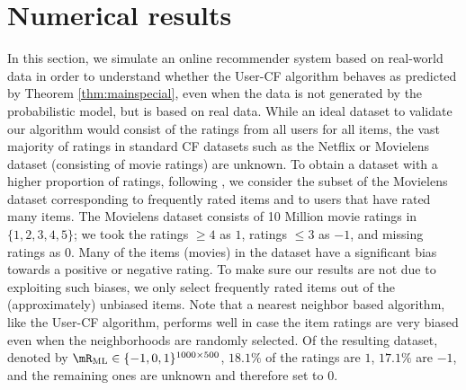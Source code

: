 \documentclass{article}
\newcommand\Comment[1]{\framebox[0.5\textwidth]{ \parbox{0.5\textwidth}{#1}  } \par}
\begin{document}
\vspace{-0.3cm}
\section{\label{sec:numres}Numerical results}
\vspace{-0.3cm}
\newcommand\RML{\mR_{\textrm{ML}}}

In this section, we simulate an online recommender system based on real-world data in order to understand whether the User-CF algorithm behaves as predicted by Theorem \ref{thm:mainspecial}, even when the data is not generated by the probabilistic model, but is based on real data. 
While an ideal dataset to validate our algorithm would consist of the ratings from all users for all items, the vast majority of ratings in standard CF datasets such as the Netflix or Movielens dataset (consisting of movie ratings) are unknown. 
To obtain a dataset with a higher proportion of ratings, following \cite{bresler_latent_2014}, we consider the subset of the Movielens dataset corresponding to frequently rated items and to users that have rated many items. 
The Movielens dataset consists of 10 Million movie ratings in $\{1,2,3,4,5\}$; we took the ratings $\geq 4$ as $1$, ratings $\leq 3$ as $-1$, and missing ratings as $0$. 
Many of the items (movies) in the dataset have a significant bias towards a positive or negative rating. 
To make sure our results are not due to exploiting such biases, we only select frequently rated items out of the (approximately) unbiased items. 
Note that a nearest neighbor based algorithm, like the User-CF algorithm, performs well in case the item ratings are very biased even when the neighborhoods are randomly selected. 
Of the resulting dataset, denoted by $\RML \in \{-1,0,1\}^{1000\times 500}$, $18.1\%$ of the ratings are $1$, $17.1\%$ are $-1$, and the remaining ones are unknown and therefore set to $0$. 

\end{document}
